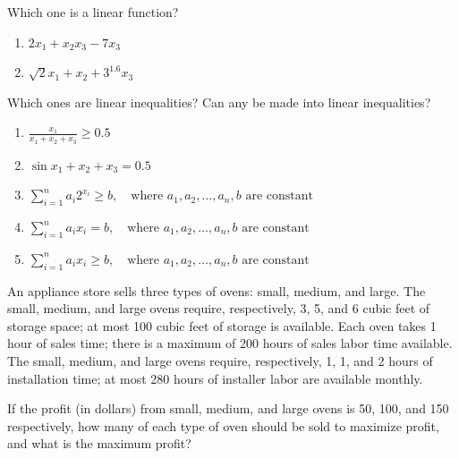 \begin{ex}{}{}
Which one is a linear function?

\begin{enumerate}
    \item $2x_1 + x_2x_3 - 7x_3$
    \item $\sqrt{2}x_1 + x_2 + 3^{1.6}x_3$
\end{enumerate}
\end{ex}


\begin{ex}{}{}
Which ones are linear inequalities?  Can any be made into linear inequalities?

\begin{enumerate}
    \item $\frac{x_1}{x_1 + x_2 + x_3} \geq 0.5$
    \item $\sin x_1 + x_2 + x_3 = 0.5$
    \item $\sum_{i=1}^n a_i 2^{x_i} \geq b, \quad \text{where } a_1, a_2, \dots, a_n, b \text{ are constant}$
    \item $\sum_{i=1}^n a_i x_i = b, \quad \text{where } a_1, a_2, \dots, a_n, b \text{ are constant}$
    \item $\sum_{i=1}^n a_i x_i \geq b, \quad \text{where } a_1, a_2, \dots, a_n, b \text{ are constant}$
\end{enumerate}
\end{ex}


\begin{ex}{}
An appliance store sells three types of ovens: small, medium, and large. The small, medium, and large ovens require, respectively, 3, 5, and 6 cubic feet of storage space; at most 100 cubic feet of storage is available. Each oven takes 1 hour of sales time; there is a maximum of 200 hours of sales labor time available. The small, medium, and large ovens require, respectively, 1, 1, and 2 hours of installation time; at most 280 hours of installer labor are available monthly.

If the profit (in dollars) from small, medium, and large ovens is 50, 100, and 150 respectively, how many of each type of oven should be sold to maximize profit, and what is the maximum profit?
\end{ex}

